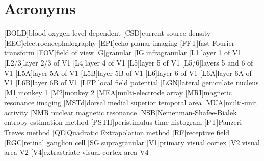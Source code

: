     \chapter*{Acronyms}
    \begin{acronym}[BOLD]
        [BOLD]{blood oxygen-level dependent}
        [CSD]{current source density}
        [EEG]{electroencephalography}
        [EPI]{echo-planar imaging}
        [FFT]{fast Fourier transform}
        [FOV]{field of view}
        [G]{granular}
        [IG]{infragranular}
        [L1]{layer 1 of \ac{V1}}
        [L2/3]{layer 2/3 of \ac{V1}}
        [L4]{layer 4 of \ac{V1}}
        [L5]{layer 5 of \ac{V1}}
        [L5/6]{layers 5 and 6 of \ac{V1}}
        [L5A]{layer 5A of \ac{V1}}
        [L5B]{layer 5B of \ac{V1}}
        [L6]{layer 6 of \ac{V1}}
        [L6A]{layer 6A of \ac{V1}}
        [L6B]{layer 6B of \ac{V1}}
        [LFP]{local field potential}
        [LGN]{lateral geniculate nucleus}
        [M1]{monkey 1}
        [M2]{monkey 2}
        [MEA]{multi-electrode array}
        [MRI]{magnetic resonance imaging}
        [MSTd]{dorsal medial superior temporal area}
        [MUA]{multi-unit activity}
        [NMR]{nuclear magnetic resonance}
        [NSB]{{N}emenman-{S}hafee-{B}ialek entropy estimation method}
        [PSTH]{peristimulus time histogram}
        [PT]{{P}anzeri-{T}reves method}
        [QE]{Quadratic Extrapolation method}
        [RF]{receptive field}
        [RGC]{retinal ganglion cell}
        [SG]{supragranular}
        [V1]{primary visual cortex}
        [V2]{visual area {V2}}
        [V4]{extrastriate visual cortex area {V4}}
    \end{acronym}                     
\endgroup

\cleardoublepage
